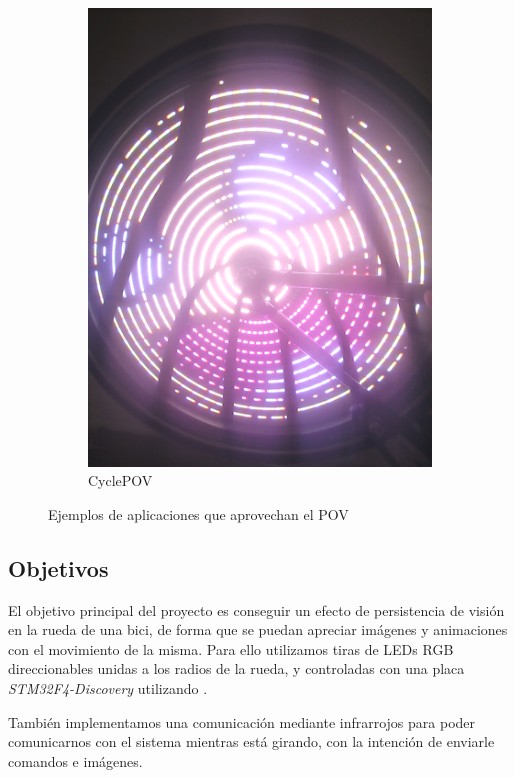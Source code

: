 \begin{figure}[!ht]
\begin{subfigure}[t]{0.4\textwidth}
		\includegraphics[width=\textwidth]{images/awesomeByke}
		\caption{CyclePOV}
	\end{subfigure}
	\caption{Ejemplos de aplicaciones que aprovechan el POV}
\end{figure}

\subsection{Objetivos}
El objetivo principal del proyecto es conseguir un efecto de persistencia de
visión en la rueda de una bici, de forma que se puedan apreciar imágenes y
animaciones con el movimiento de la misma. Para ello utilizamos tiras de LEDs
RGB direccionables unidas a los radios de la rueda, y controladas con una placa
\textsl{STM32F4-Discovery} utilizando \uCOS .

También implementamos una comunicación mediante infrarrojos para poder
comunicarnos con el sistema mientras está girando, con la intención de enviarle
comandos e imágenes.

